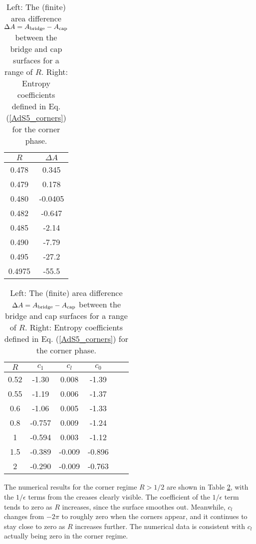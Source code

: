 \documentclass[11 pt]{article}
\begin{document}
\begin{table}[h!]
\hskip 10mm
\begin{subtable}{0.3\textwidth}
\centering
\begin{tabular}{ |c||c| }
 \hline
 $R$ & $\Delta A$\\
 \hline
  0.478 & 0.345\\
  0.479 & 0.178\\
  0.480 & -0.0405\\
  0.482 & -0.647\\
  0.485 & -2.14\\
  0.490 & -7.79\\
  0.495 & -27.2\\
  0.4975 & -55.5\\
 \hline
\end{tabular}
\caption{\label{tab:torus_bridge_coeff}}
\end{subtable}
%
\begin{subtable}{0.7\textwidth}
\centering
\begin{tabular}{ |c||c|c|c|c|c|  }
 \hline
 $R$ & $c_1$ & $c_l$ & $c_0$\\
 \hline
  0.52 & -1.30 & 0.008 & -1.39\\
  0.55 & -1.19 & 0.006 & -1.37\\
  0.6 & -1.06 & 0.005 & -1.33 \\
  0.8 & -0.757 & 0.009 & -1.24\\
  1 & -0.594 & 0.003 & -1.12\\
  1.5 & -0.389 & -0.009 & -0.896\\
  2 & -0.290 & -0.009 & -0.763\\
 \hline
\end{tabular}
\caption{\label{tab:torus_corner_coeff}}
\end{subtable}
\caption{Left: The (finite) area difference $\Delta A=A_{\rm bridge}-A_{\rm cap}$ between the bridge and cap surfaces for a range of $R$. Right: Entropy coefficients defined in Eq. (\ref{AdS5_corners}) for the corner phase.}
\end{table}


The numerical results for the corner regime $R>1/2$ are shown in Table \ref{tab:torus_corner_coeff}, with the $1/\epsilon$ terms from the creases clearly visible. The coefficient of the $1/\epsilon$ term tends to zero as $R$ increases, since the surface smoothes out. Meanwhile, $c_l$ changes from $-2\pi$ to roughly zero when the corners appear, and it continues to stay close to zero as $R$ increases further. The numerical data is consistent with $c_l$ actually being zero in the corner regime.
\end{document}
